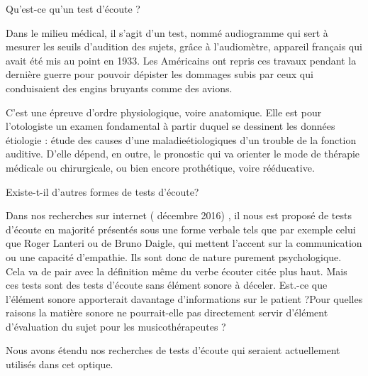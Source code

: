 \documentclass[12pt,french]{report}
\makeatletter
\let\SF@@footnote\footnote
\def\footnote{\ifx\protect\@typeset@protect
    \expandafter\SF@@footnote
  \else
    \expandafter\SF@gobble@opt
  \fi
}
\edef\SF@gobble@opt{\noexpand\protect
  \expandafter\noexpand\csname SF@gobble@opt \endcsname}
\makeatother
\begin{document}
Qu'est-ce qu'un test d'écoute ?

Dans le milieu médical, il s'agit d'un test, nommé audiogramme qui
sert à mesurer les seuils d'audition des sujets, grâce à l'audiomètre,
appareil français qui avait été mis au point en 1933. Les Américains
ont repris ces travaux pendant la dernière guerre pour pouvoir dépister
les dommages subis par ceux qui conduisaient des engins bruyants comme
des avions.

C'est une épreuve d'ordre physiologique, voire anatomique.\emph{ }Elle
est pour l\textquoteright otologiste
un examen fondamental à partir duquel se dessinent les données \footnote{étiologie : étude des causes d'une maladie}étiologiques
d'un trouble de la fonction auditive. D'elle dépend, en outre, le
pronostic qui va orienter le mode de thérapie médicale ou chirurgicale,
ou bien encore prothétique, voire rééducative. 

Existe-t-il d'autres formes de tests d'écoute?

Dans nos recherches sur internet ( décembre 2016) , il nous est proposé
de tests d'écoute en majorité présentés sous une forme verbale tels
que par exemple celui que Roger Lanteri ou de Bruno Daigle, qui mettent
l'accent sur la communication ou une capacité d'empathie. Ils sont
donc de nature purement psychologique. Cela va de pair avec la définition
même du verbe écouter citée plus haut. Mais ces tests sont des tests
d'écoute sans élément sonore à déceler. Est.-ce que l'élément sonore
apporterait davantage d'informations sur le patient ?Pour quelles
raisons la matière sonore ne pourrait-elle pas directement servir
d'élément d'évaluation du sujet pour les musicothérapeutes ? 

Nous avons étendu nos recherches de tests d'écoute qui seraient actuellement
utilisés dans cet optique.
\end{document}
